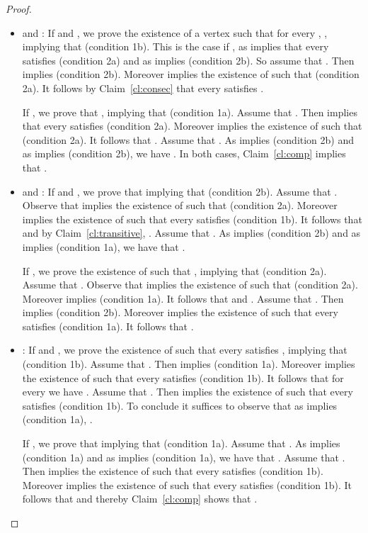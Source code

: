 \begin{proof}
\begin{proofclaim}
\begin{itemize}
\item  and : If   and , we prove the existence of a vertex  such that for every , , implying that  (condition 1b). This is the case if , as  implies that every  satisfies  (condition 2a) and as  implies  (condition 2b). So assume that . Then  implies  (condition 2b). Moreover  implies the existence of  such that  (condition 2a). It follows by Claim~\ref{cl:consec} that every  satisfies .

If  , we prove that , implying that  (condition 1a). Assume that . Then   implies that every  satisfies  (condition 2a). Moreover  implies the existence of  such that  (condition 2a). It follows that . Assume that . As  implies  (condition 2b) and as  implies  (condition 2b), we have . In both cases, Claim~\ref{cl:comp} implies that .


\item  and : If   and , we prove that  implying that  (condition 2b). Assume that . Observe that  implies the existence of  such that  (condition 2a). Moreover  implies the existence of  such that every  satisfies  (condition 1b). It follows that  and by Claim~\ref{cl:transitive}, . Assume that . As  implies  (condition 2b) and as  implies  (condition 1a), we have that .


If , we prove the existence of  such that , implying that  (condition 2a). Assume that . Observe that  implies the existence of  such that  (condition 2a). Moreover  implies  (condition 1a). It follows that  and . Assume that . Then  implies  (condition 2b). Moreover  implies the existence of  such that every  satisfies  (condition 1a). It follows that  .


\item : If   and , we prove the existence of  such that every  satisfies , implying that  (condition 1b). Assume that . Then  implies  (condition 1a). Moreover  implies the existence of  such that every  satisfies  (condition 1b). It follows that for every  we have . Assume that . Then  implies the existence of  such that every  satisfies  (condition 1b). To conclude it suffices to observe that as  implies  (condition 1a), .


If , we prove that  implying that  (condition 1a). Assume that . As  implies  (condition 1a) and  as  implies   (condition 1a), we have that . Assume that . Then  implies the existence of  such that every  satisfies  (condition 1b). Moreover  implies the existence of  such that every  satisfies  (condition 1b). It follows that  and thereby Claim~\ref{cl:comp} shows that .
\end{itemize} \end{proofclaim}


\end{proof}
